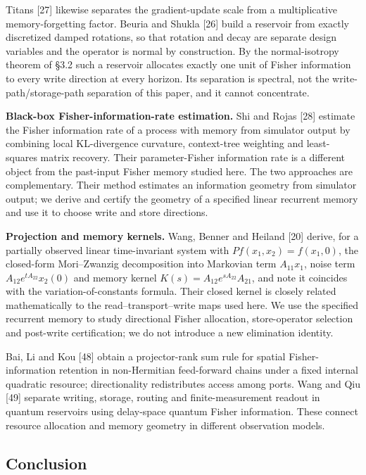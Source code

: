 \documentclass[
  10pt,
]{article}
\begin{document}
Titans {[}27{]} likewise separates the gradient-update scale from a
multiplicative memory-forgetting factor. Beuria and Shukla {[}26{]}
build a reservoir from exactly discretized damped rotations, so that
rotation and decay are separate design variables and the operator is
normal by construction. By the normal-isotropy theorem of §3.2 such a
reservoir allocates exactly one unit of Fisher information to every
write direction at every horizon. Its separation is spectral, not the
write-path/storage-path separation of this paper, and it cannot
concentrate.

\textbf{Black-box Fisher-information-rate estimation.} Shi and Rojas
{[}28{]} estimate the Fisher information rate of a process with memory
from simulator output by combining local KL-divergence curvature,
context-tree weighting and least-squares matrix recovery. Their
parameter-Fisher information rate is a different object from the
past-input Fisher memory studied here. The two approaches are
complementary. Their method estimates an information geometry from
simulator output; we derive and certify the geometry of a specified
linear recurrent memory and use it to choose write and store directions.

\textbf{Projection and memory kernels.} Wang, Benner and Heiland
{[}20{]} derive, for a partially observed linear time-invariant system
with \(P f(x_1,x_2)=f(x_1,0)\), the closed-form Mori--Zwanzig
decomposition into Markovian term \(A_{11}x_1\), noise term
\(A_{12}e^{tA_{22}}x_2(0)\) and memory kernel
\(K(s)=A_{12}e^{sA_{22}}A_{21}\), and note it coincides with the
variation-of-constants formula. Their closed kernel is closely related
mathematically to the read--transport--write maps used here. We use the
specified recurrent memory to study directional Fisher allocation,
store-operator selection and post-write certification; we do not
introduce a new elimination identity.

Bai, Li and Kou {[}48{]} obtain a projector-rank sum rule for spatial
Fisher-information retention in non-Hermitian feed-forward chains under
a fixed internal quadratic resource; directionality redistributes access
among ports. Wang and Qiu {[}49{]} separate writing, storage, routing
and finite-measurement readout in quantum reservoirs using delay-space
quantum Fisher information. These connect resource allocation and memory
geometry in different observation models.

\subsection{Conclusion}\label{conclusion}
\end{document}
